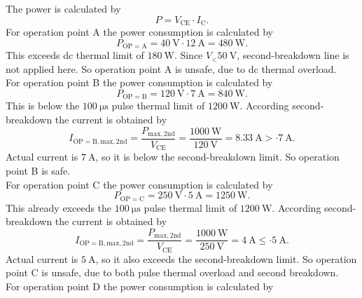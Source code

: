 \begin{solutionblock}
    The power is calculated by 
    \begin{equation}
        P = V_\mathrm{CE} \cdot I_\mathrm{C}.
    \end{equation}
    For operation point A the power consumption is calculated by
    \begin{equation}
        P_\mathrm{OP=A} = \SI{40}{\volt} \cdot \SI{12}{\ampere} = \SI{480}{\watt}.
    \end{equation}
    This exceeds dc thermal limit of $\SI{180}{\watt}$. Since $V_\mathrm < \SI{50}{\volt}$, second-breakdown line is not applied here.
    So operation point A is unsafe, due to dc thermal overload.    \\
    For operation point B the power consumption is calculated by
    \begin{equation}
        P_\mathrm{OP=B} = \SI{120}{\volt} \cdot \SI{7}{\ampere} = \SI{840}{\watt}.
    \end{equation}
    This is below the $\SI{100}{\micro\second}$  pulse thermal limit of $\SI{1200}{\watt}$.
    According second-breakdown the current is obtained by
    \begin{equation}
        I_\mathrm{OP=B, max,2nd} = \frac{P_\mathrm{max,2nd}} {V_\mathrm{CE}} 
        = \frac{\SI{1000}{\watt}} {\SI{120}{\volt}} = \SI{8.33}{\ampere} > \cdot \SI{7}{\ampere}.
    \end{equation}
    Actual current is $\SI{7}{\ampere}$, so it is below the second-breakdown limit.
    So operation point B is safe. \\
    For operation point C the power consumption is calculated by
    \begin{equation}
        P_\mathrm{OP=C} = \SI{250}{\volt} \cdot \SI{5}{\ampere} = \SI{1250}{\watt}.
    \end{equation}
    This already exceeds the $\SI{100}{\micro\second}$  pulse thermal limit of $\SI{1200}{\watt}$.
    According second-breakdown the current is obtained by
    \begin{equation}
        I_\mathrm{OP=B, max,2nd} = \frac{P_\mathrm{max,2nd}} {V_\mathrm{CE}} 
        = \frac{\SI{1000}{\watt}} {\SI{250}{\volt}} = \SI{4}{\ampere} \le \cdot \SI{5}{\ampere}.
    \end{equation}
    Actual current is $\SI{5}{\ampere}$, so it also exceeds the second-breakdown limit.
    So operation point C is unsafe, due to both pulse thermal overload and second breakdown. \\
    For operation point D the power consumption is calculated by

\end{solutionblock}
